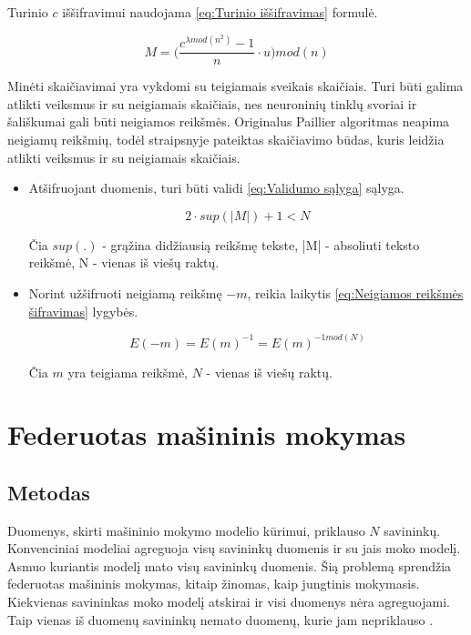 \documentclass{VUMIFInfBakalaurinis}
\begin{document}
\par Turinio $c$ iššifravimui naudojama \eqref{eq:Turinio iššifravimas} formulė.

\begin{equation}
    M = \Big(\frac{c^{\lambda mod (n^{2})} - 1}{n} \cdot u\Big) mod (n)
    \label{eq:Turinio iššifravimas}
\end{equation}

\par Minėti skaičiavimai yra vykdomi su teigiamais sveikais skaičiais. Turi būti galima atlikti veiksmus ir su neigiamais skaičiais, nes neuroninių tinklų svoriai ir šališkumai gali būti neigiamos reikšmės. Originalus Paillier algoritmas neapima neigiamų reikšmių, todėl \cite{16} straipsnyje pateiktas skaičiavimo būdas, kuris leidžia atlikti veiksmus ir su neigiamais skaičiais.

\begin{itemize}
    \item Atšifruojant duomenis, turi būti validi \eqref{eq:Validumo sąlyga} sąlyga.
    
    \begin{equation}
        2 \cdot sup(|M|) + 1 < N
        \label{eq:Validumo sąlyga}
    \end{equation}

    Čia $sup(.)$ - grąžina didžiausią reikšmę tekste, |M| - absoliuti teksto reikšmė, N - vienas iš viešų raktų.
    \item Norint užšifruoti neigiamą reikšmę $-m$, reikia laikytis \eqref{eq:Neigiamos reikšmės šifravimas} lygybės.
    
    \begin{equation}
        E(-m) = E(m)^{-1} = E(m)^{-1 mod(N)}
        \label{eq:Neigiamos reikšmės šifravimas}
    \end{equation}
    
    Čia $m$ yra teigiama reikšmė, $N$ - vienas iš viešų raktų.
\end{itemize}

\section{Federuotas mašininis mokymas}
\subsection{Metodas}
\par Duomenys, skirti mašininio mokymo modelio kūrimui, priklauso $N$ savininkų. Konvenciniai modeliai agreguoja visų savininkų duomenis ir su jais moko modelį. Asmuo kuriantis modelį mato visų savininkų duomenis. Šią problemą sprendžia federuotas mašininis mokymas, kitaip žinomas, kaip jungtinis mokymasis. Kiekvienas savininkas moko modelį atskirai ir visi duomenys nėra agreguojami. Taip vienas iš duomenų savininkų nemato duomenų, kurie jam nepriklauso \cite{18}.
\end{document}
